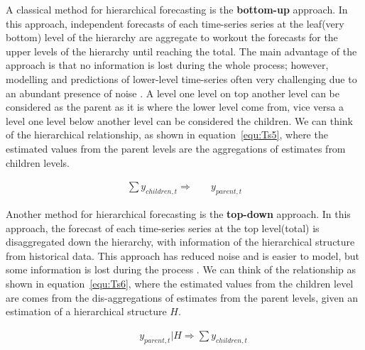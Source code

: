 A classical method for hierarchical forecasting is the \textbf{bottom-up} approach. In this approach,  independent forecasts of each time-series series at the leaf(very bottom) level of the hierarchy are aggregate to workout the forecasts for the upper levels of the hierarchy until reaching the total. The main advantage of the approach is that no information is lost during the whole process; however, modelling and predictions of lower-level time-series often very challenging due to an abundant presence of noise \citep{hyndman2014optimally}. A level one level on top another level can be considered as the parent as it is where the lower level come from, vice versa a level one level below another level can be considered the children.  We can think of the hierarchical relationship, as shown in equation~\ref{equ:Ts5}, where the estimated values from the parent levels are the aggregations of estimates from children levels. 

\begin{equation}\label{equ:Ts5}
\begin{aligned}
\sum y_{children,t} \Rightarrow \quad & y_{parent,t} 
\end{aligned}
\end{equation}

\newpara

Another method for hierarchical forecasting is the \textbf{top-down} approach. In this approach, the forecast of each time-series series at the top level(total) is disaggregated down the hierarchy, with information of the hierarchical structure from historical data. This approach has reduced noise and is easier to model, but some information is lost during the process \citep{hyndman2014optimally}.  We can think of the relationship as shown in equation~\ref{equ:Ts6}, where the estimated values from the children level are comes from the dis-aggregations of estimates from the parent levels, given an estimation of a hierarchical structure $H$. 

\begin{equation}\label{equ:Ts6}
\begin{aligned}
\quad & y_{parent,t} | H \Rightarrow \sum y_{children,t} 
\end{aligned}
\end{equation}

